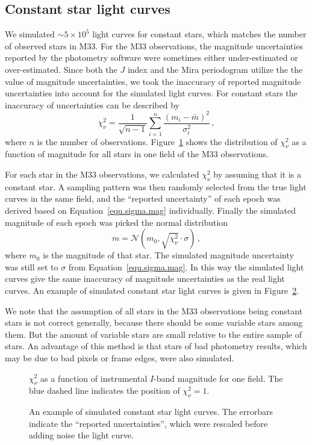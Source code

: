 \subsection{Constant star light curves}

We simulated $\sim 5\times 10^5$ light curves for constant stars, which matches the number of observed stars in M33. For the M33 observations, the magnitude uncertainties reported by the photometry software were sometimes either under-estimated or over-estimated. Since both the $J$ index and the Mira periodogram utilize the the value of magnitude uncertainties, we took the inaccuracy of reported magnitude uncertainties into account for the simulated light curves. For constant stars the inaccuracy of uncertainties can be described by
\begin{equation}
\chi_\nu^2 = \frac{1}{\sqrt{n-1}}\sum_{i=1}^n\frac{(m_i-\bar m)^2}{\sigma_i^2}\,,
\end{equation}
where $n$ is the number of observations. Figure~\ref{fig.chi.dist.example} shows the distribution of $\chi_\nu^2$ as a function of magnitude for all stars in one field of the M33 observations.

For each star in the M33 observations, we calculated $\chi_\nu^2$ by assuming that it is a constant star. A sampling pattern was then randomly selected from the true light curves in the same field, and the ``reported uncertainty'' of each epoch was derived based on Equation~\ref{equ.sigma.mag} individually. Finally the simulated magnitude of each epoch was picked the normal distribution
\begin{equation}
m = \mathcal{N}(m_0,\sqrt{\chi_\nu^2}\cdot\sigma)\,,
\end{equation}
where $m_0$ is the magnitude of that star. The simulated magnitude uncertainty was still set to $\sigma$ from Equation~\ref{equ.sigma.mag}. In this way the simulated light curves give the same inaccuracy of magnitude uncertainties as the real light curves. An example of simulated constant star light curves is given in Figure~\ref{fig.const.flc.example}.

We note that the assumption of all stars in the M33 observations being constant stars is not correct generally, because there should be some variable stars among them. But the amount of variable stars are small relative to the entire sample of stars. An advantage of this method is that stars of bad photometry results, which may be due to bad pixels or frame edges, were also simulated.


\begin{figure}
\caption{$\chi_\nu^2$ as a function of instrumental $I$-band magnitude for one field. The blue dashed line indicates the position of $\chi_\nu^2=1$.}\label{fig.chi.dist.example}
\end{figure}

\begin{figure}
\caption{An example of simulated constant star light curves. The errorbars indicate the ``reported uncertainties'', which were rescaled before adding noise the light curve.}\label{fig.const.flc.example}
\end{figure}




